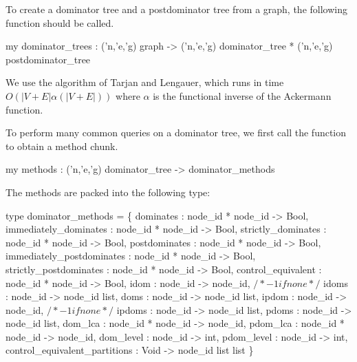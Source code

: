 To create a dominator tree and a postdominator tree
from a graph, the following function should be called.
\begin{SML}
 my dominator_trees : ('n,'e,'g) graph ->
         ('n,'e,'g) dominator_tree * ('n,'e,'g) postdominator_tree
\end{SML}
We use the algorithm of Tarjan and Lengauer, which
runs in time $O(|V+E|\alpha(|V+E|))$ where $\alpha$ is the functional
inverse of the Ackermann function.

To perform many common queries on a dominator tree, we first
call the function  to obtain a method chunk.
\begin{SML} 
  my methods : ('n,'e,'g) dominator_tree -> dominator_methods
\end{SML}

The methods are packed into the following type:
\begin{SML}
   type dominator_methods =
         \{ dominates              : node_id * node_id -> Bool,
           immediately_dominates  : node_id * node_id -> Bool,
           strictly_dominates     : node_id * node_id -> Bool,
           postdominates          : node_id * node_id -> Bool,
           immediately_postdominates : node_id * node_id -> Bool,
           strictly_postdominates : node_id * node_id -> Bool,
           control_equivalent     : node_id * node_id -> Bool,
           idom         : node_id -> node_id, $/* -1 if none */$
           idoms        : node_id -> node_id list,
           doms         : node_id -> node_id list,
           ipdom        : node_id -> node_id, $/* -1 if none */$
           ipdoms       : node_id -> node_id list,
           pdoms        : node_id -> node_id list,
           dom_lca      : node_id * node_id -> node_id,
           pdom_lca     : node_id * node_id -> node_id,
           dom_level    : node_id -> int,
           pdom_level   : node_id -> int,
           control_equivalent_partitions : Void -> node_id list list
         \}
\end{SML}

